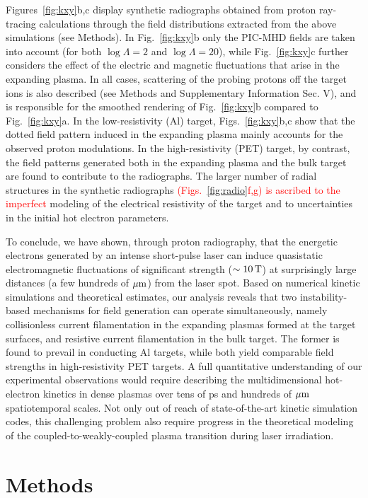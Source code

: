 \documentclass[aps,twocolumn,showpacs,superscriptaddress]{revtex4}
\begin{document}
Figures~\ref{fig:kxy}b,c display synthetic radiographs obtained from proton ray-tracing calculations through the field distributions extracted from the above simulations (see Methods). In Fig.~\ref{fig:kxy}b only the PIC-MHD fields are taken into account (for both $\log \Lambda =2$ and $\log \Lambda = 20$), while Fig.~\ref{fig:kxy}c further considers the effect of the electric and magnetic fluctuations that arise in the expanding plasma. In all cases, scattering of the probing protons off the target ions is also described (see Methods and Supplementary Information Sec. V), and is responsible for the smoothed rendering of Fig.~\ref{fig:kxy}b compared to Fig.~\ref{fig:kxy}a. In the low-resistivity (Al) target,  Figs.~\ref{fig:kxy}b,c show that the dotted field pattern induced in the expanding plasma mainly accounts for the observed proton modulations. In the high-resistivity (PET) target, by contrast, the field patterns generated both in the expanding plasma and the bulk target are found to contribute to the radiographs. The larger number of radial structures in the synthetic radiographs \textcolor{red}{(Figs.~\ref{fig:radio}f,g) is ascribed to the imperfect} modeling of the electrical resistivity of the target and to uncertainties in the initial hot electron parameters.

To conclude, we have shown, through proton radiography, that the energetic electrons generated by an intense short-pulse laser can induce quasistatic electromagnetic fluctuations of significant strength ($\sim 10\,\rm T$) at surprisingly large distances (a few hundreds of $\rm \mu m$) from the laser spot. Based on numerical kinetic simulations and theoretical estimates, our analysis reveals that two instability-based mechanisms for field generation can operate simultaneously, namely collisionless current filamentation in the expanding plasmas formed at the target surfaces, and resistive current filamentation in the bulk target. The former is found to prevail in conducting Al targets, while both yield comparable field strengths in high-resistivity PET targets. A full quantitative understanding of our experimental observations would require describing the multidimensional hot-electron kinetics in dense plasmas over tens of ps and hundreds of $\rm \mu m$ spatiotemporal scales. Not only out of reach of state-of-the-art kinetic simulation codes, this challenging problem also require progress in the theoretical modeling of the coupled-to-weakly-coupled plasma transition during laser irradiation.

\section*{Methods}
\end{document}
